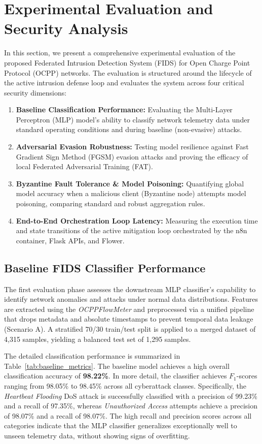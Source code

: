 \documentclass[10pt, a4paper, conference]{IEEEtran}
\begin{document}
\section{Experimental Evaluation and Security Analysis}
\label{sec:evaluation}

In this section, we present a comprehensive experimental evaluation of the proposed Federated Intrusion Detection System (FIDS) for Open Charge Point Protocol (OCPP) networks. The evaluation is structured around the lifecycle of the active intrusion defense loop and evaluates the system across four critical security dimensions:
\begin{enumerate}
    \item \textbf{Baseline Classification Performance:} Evaluating the Multi-Layer Perceptron (MLP) model's ability to classify network telemetry data under standard operating conditions and during baseline (non-evasive) attacks.
    \item \textbf{Adversarial Evasion Robustness:} Testing model resilience against Fast Gradient Sign Method (FGSM) evasion attacks and proving the efficacy of local Federated Adversarial Training (FAT).
    \item \textbf{Byzantine Fault Tolerance \& Model Poisoning:} Quantifying global model accuracy when a malicious client (Byzantine node) attempts model poisoning, comparing standard and robust aggregation rules.
    \item \textbf{End-to-End Orchestration Loop Latency:} Measuring the execution time and state transitions of the active mitigation loop orchestrated by the n8n container, Flask APIs, and Flower.
\end{enumerate}

\subsection{Baseline FIDS Classifier Performance}
\label{subsec:baseline_performance}
The first evaluation phase assesses the downstream MLP classifier's capability to identify network anomalies and attacks under normal data distributions. Features are extracted using the \textit{OCPPFlowMeter} and preprocessed via a unified pipeline that drops metadata and absolute timestamps to prevent temporal data leakage (Scenario A). A stratified 70/30 train/test split is applied to a merged dataset of 4,315 samples, yielding a balanced test set of 1,295 samples.

The detailed classification performance is summarized in Table~\ref{tab:baseline_metrics}. The baseline model achieves a high overall classification accuracy of \textbf{98.22\%}. In more detail, the classifier achieves $F_1$-scores ranging from 98.05\% to 98.45\% across all cyberattack classes. Specifically, the \textit{Heartbeat Flooding} DoS attack is successfully classified with a precision of 99.23\% and a recall of 97.35\%, whereas \textit{Unauthorized Access} attempts achieve a precision of 98.07\% and a recall of 98.07\%. The high recall and precision scores across all categories indicate that the MLP classifier generalizes exceptionally well to unseen telemetry data, without showing signs of overfitting.
\end{document}
